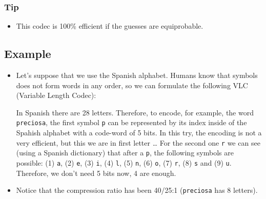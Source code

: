 \subsubsection{Tip}
\begin{itemize}
\tightlist
\item
  This codec is 100\% efficient if the guesses are equiprobable.
\end{itemize}
\subsection{Example}
\begin{itemize}
\item
  Let's suppose that we use the Spanish alphabet. Humans know that
  symbols does not form words in any order, so we can formulate the
  following VLC (Variable Length Codec):

  In Spanish there are 28 letters. Therefore, to encode, for example,
  the word \texttt{preciosa}, the first symbol \texttt{p} can be
  represented by its index inside of the Spahish alphabet with a
  code-word of 5 bits. In this try, the encoding is not a very
  efficient, but this we are in first letter \ldots{} For the second one
  \texttt{r} we can see (using a Spanish dictionary) that after a
  \texttt{p}, the following symbols are possible: (1) \texttt{a}, (2)
  \texttt{e}, (3) \texttt{i}, (4) \texttt{l}, (5) \texttt{n}, (6)
  \texttt{o}, (7) \texttt{r}, (8) \texttt{s} and (9) \texttt{u}.
  Therefore, we don't need 5 bits now, 4 are enough.
\end{itemize}


\begin{itemize}
\tightlist
\item
  Notice that the compression ratio has been 40/25:1 (\texttt{preciosa}
  has 8 letters).
\end{itemize}


